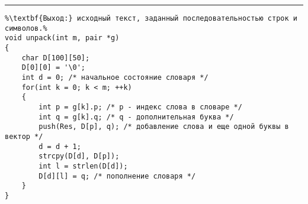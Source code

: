 \vspace{5pt} \hrule
\begin{lstlisting}[caption={Распаковка по методу Лемпела - Зива}, label=p230_2, escapechar=\%]
%\noindent\textbf{Вход:} сжатый текст, представленный массивом пар g: \textbf{array} [1..m] \textbf{of record} p: \textbf{int}; q: \textbf{char end record}, где p - номер слова в словаре, q - код дополняющей буквы.\\%
%\textbf{Выход:} исходный текст, заданный последовательностью строк и символов.%
void unpack(int m, pair *g)
{
	char D[100][50];
	D[0][0] = '\0';
	int d = 0; /* начальное состояние словаря */
	for(int k = 0; k < m; ++k)
	{
		int p = g[k].p; /* p - индекс слова в словаре */
		int q = g[k].q; /* q - дополнительная буква */
		push(Res, D[p], q); /* добавление слова и еще одной буквы в вектор */
		d = d + 1;
		strcpy(D[d], D[p]);
		int l = strlen(D[d]);
		D[d][l] = q; /* пополнение словаря */
	}
}
\end{lstlisting}
